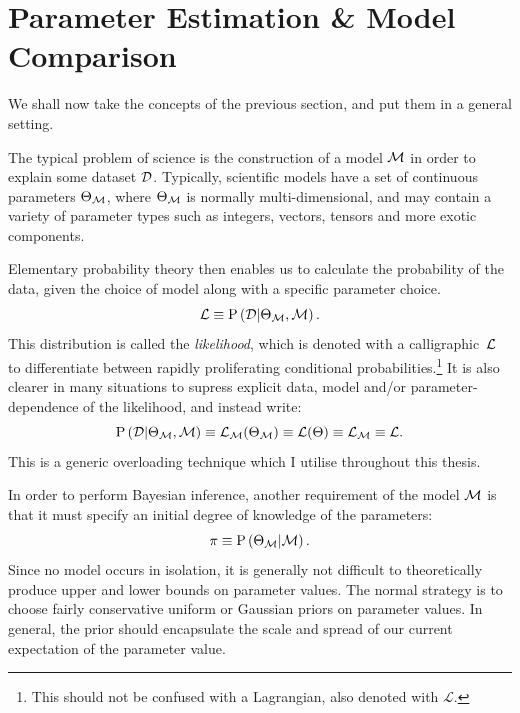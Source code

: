 \section{Parameter Estimation \& Model Comparison}
\label{sec:bay:model_comp}
We shall now take the concepts of the previous section, and put them in a general setting. 

The typical problem of science is the construction of a model $\mathcal{M}$ in order to explain some dataset $\mathcal{D}$. Typically, scientific models have a set of continuous parameters $\Theta_{\mathcal{M}}$, where $\Theta_{\mathcal{M}}$ is normally multi-dimensional, and may contain a variety of parameter types such as integers, vectors, tensors and more exotic components.

Elementary probability theory then enables us to calculate the probability of the data, given the choice of model along with a specific parameter choice.
\begin{equation}
  \mathcal{L}\equiv\mathrm{P}\left(\mathcal{D}\middle|\Theta_{\mathcal{M}},\mathcal{M}\right).
  \label{eqn:bay:lik_def}
\end{equation}
This distribution is called the {\em likelihood}, which is denoted with a calligraphic~$\mathcal{L}$ to differentiate between rapidly proliferating conditional probabilities.\footnote{This should not be confused with a Lagrangian, also denoted with $\mathcal{L}$.} It is also clearer in many situations to supress explicit data, model and/or parameter-dependence of the likelihood, and instead write:
\begin{equation}
  \mathrm{P}\left(\mathcal{D}\middle|\Theta_{\mathcal{M}},\mathcal{M}\right)
  \equiv
  \mathcal{L}_{\mathcal{M}}(\Theta_{\mathcal{M}})
  \equiv
  \mathcal{L}(\Theta)
  \equiv
  \mathcal{L}_{\mathcal{M}}
  \equiv
  \mathcal{L}.\nonumber
\end{equation}
This is a generic overloading technique which I utilise throughout this thesis.

In order to perform Bayesian inference, another requirement of the model $\mathcal{M}$ is that it must specify an initial degree of knowledge of the parameters:
\begin{equation}
  \pi\equiv\mathrm{P}\left(\Theta_{\mathcal{M}}\middle|\mathcal{M}\right).
  \label{eqn:bay:prior_def}
\end{equation}
Since no model occurs in isolation, it is generally not difficult to theoretically produce upper and lower bounds on parameter values. The normal strategy is to choose fairly conservative uniform or Gaussian priors on parameter values. In general, the prior should encapsulate the scale and spread of our current expectation of the parameter value.

